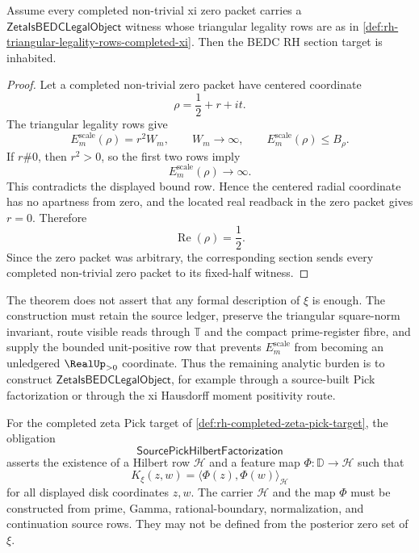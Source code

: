 \begin{theorem}
\label{thm:rh-legal-triangular-xi-construction-conditionally-rh-sufficient}
Assume every completed non-trivial xi zero packet carries a
$\mathsf{ZetaIsBEDCLegalObject}$ witness whose triangular legality rows
are as in \autoref{def:rh-triangular-legality-rows-completed-xi}. Then
the BEDC RH section target is inhabited.
\end{theorem}

\begin{proof}
Let a completed non-trivial zero packet have centered coordinate
$$
\rho=\frac12+r+it.
$$
The triangular legality rows give
$$
E_m^{\mathrm{scale}}(\rho)=r^2W_m,
\qquad
W_m\to\infty,
\qquad
E_m^{\mathrm{scale}}(\rho)\le B_{\rho}.
$$
If $r\#0$, then $r^2>0$, so the first two rows imply
$$
E_m^{\mathrm{scale}}(\rho)\to\infty.
$$
This contradicts the displayed bound row. Hence the centered radial
coordinate has no apartness from zero, and the located real readback in
the zero packet gives $r=0$. Therefore
$$
\operatorname{Re}(\rho)=\frac12.
$$
Since the zero packet was arbitrary, the corresponding section sends
every completed non-trivial zero packet to its fixed-half witness.
\end{proof}

\begin{principle}
\label{prin:rh-legal-construction-stronger-than-description}
The theorem does not assert that any formal description of $\xi$ is
enough. The construction must retain the source ledger, preserve the
triangular square-norm invariant, route visible reads through
$\mathbb T$ and the compact prime-register fibre, and supply the bounded
unit-positive row that prevents $E_m^{\mathrm{scale}}$ from becoming an
unledgered $\RealUp_{>0}$ coordinate. Thus the remaining analytic burden
is to construct $\mathsf{ZetaIsBEDCLegalObject}$, for example through a
source-built Pick factorization or through the xi Hausdorff moment
positivity route.
\end{principle}

\begin{definition}[SourcePickHilbertFactorization]
\label{def:rh-source-positive-frontier-pick-hilbert-factorization}
For the completed zeta Pick target of
\autoref{def:rh-completed-zeta-pick-target}, the obligation
$$
\mathsf{SourcePickHilbertFactorization}
$$
asserts the existence of a Hilbert row $\mathcal H$ and a feature map
$\Phi:\mathbb D\to\mathcal H$ such that
$$
K_{\xi}(z,w)
=
\langle \Phi(z),\Phi(w)\rangle_{\mathcal H}
$$
for all displayed disk coordinates $z,w$. The carrier $\mathcal H$ and
the map $\Phi$ must be constructed from prime, Gamma, rational-boundary,
normalization, and continuation source rows. They may not be defined from
the posterior zero set of $\xi$.
\end{definition}

